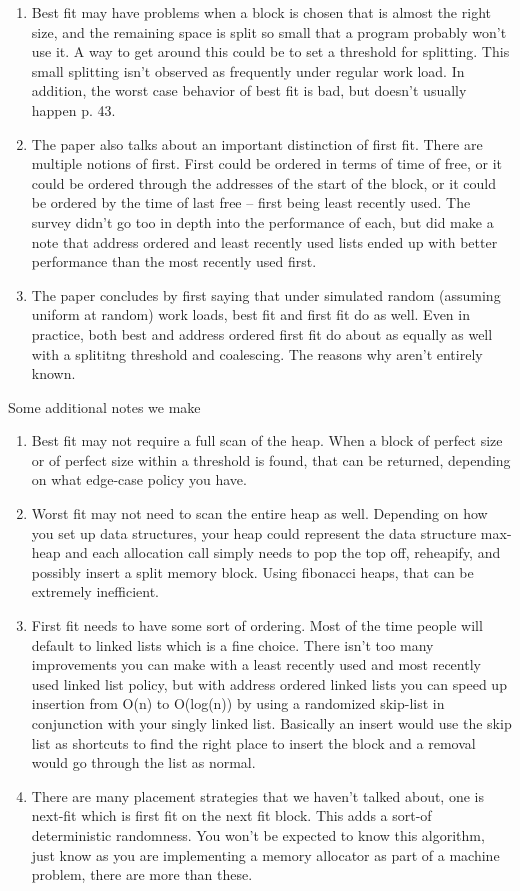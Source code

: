 \begin{enumerate}
\item Best fit may have problems when a block is chosen that is almost the right size, and the remaining space is split so small that a program probably won't use it.
  A way to get around this could be to set a threshold for splitting.
  This small splitting isn't observed as frequently under regular work load.
  In addition, the worst case behavior of best fit is bad, but doesn't usually happen p. 43.
\item The paper also talks about an important distinction of first fit.
  There are multiple notions of first.
  First could be ordered in terms of time of free, or it could be ordered through the addresses of the start of the block, or it could be ordered by the time of last free -- first being least recently used.
  The survey didn't go too in depth into the performance of each, but did make a note that address ordered and least recently used lists ended up with better performance than the most recently used first.
\item The paper concludes by first saying that under simulated random (assuming uniform at random) work loads, best fit and first fit do as well. Even in practice, both best and address ordered first fit do about as equally as well with a splititng threshold and coalescing. The reasons why aren't entirely known.
\end{enumerate}

Some additional notes we make

\begin{enumerate}
\item Best fit may not require a full scan of the heap. When a block of perfect size or of perfect size within a threshold is found, that can be returned, depending on what edge-case policy you have.
\item Worst fit may not need to scan the entire heap as well. Depending on how you set up data structures, your heap could represent the data structure max-heap and each allocation call simply needs to pop the top off, reheapify, and possibly insert a split memory block.
  Using fibonacci heaps, that can be extremely inefficient.
\item First fit needs to have some sort of ordering. Most of the time people will default to linked lists which is a fine choice. There isn't too many improvements you can make with a least recently used and most recently used linked list policy, but with address ordered linked lists you can speed up insertion from O(n) to O(log(n)) by using a randomized skip-list in conjunction with your singly linked list.
  Basically an insert would use the skip list as shortcuts to find the right place to insert the block and a removal would go through the list as normal.
\item There are many placement strategies that we haven't talked about, one is next-fit which is first fit on the next fit block. This adds a sort-of deterministic randomness. You won't be expected to know this algorithm, just know as you are implementing a memory allocator as part of a machine problem, there are more than these.
  \end{enumerate}

